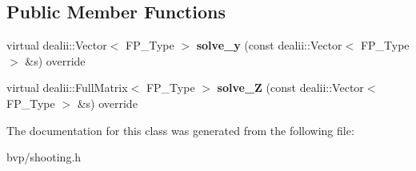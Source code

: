 \subsection*{Public Member Functions}
\begin{DoxyCompactItemize}
\item 
\mbox{\label{classSF__External_ab1b21bf6466805c2ca698a271cc858a2}} 
virtual dealii\+::\+Vector$<$ F\+P\+\_\+\+Type $>$ {\bfseries solve\+\_\+y} (const dealii\+::\+Vector$<$ F\+P\+\_\+\+Type $>$ \&s) override
\item 
\mbox{\label{classSF__External_a879454b3ef1b1dc338e3d1a10c82fdb6}} 
virtual dealii\+::\+Full\+Matrix$<$ F\+P\+\_\+\+Type $>$ {\bfseries solve\+\_\+Z} (const dealii\+::\+Vector$<$ F\+P\+\_\+\+Type $>$ \&s) override
\end{DoxyCompactItemize}


The documentation for this class was generated from the following file\+:\begin{DoxyCompactItemize}
\item 
bvp/shooting.\+h\end{DoxyCompactItemize}
